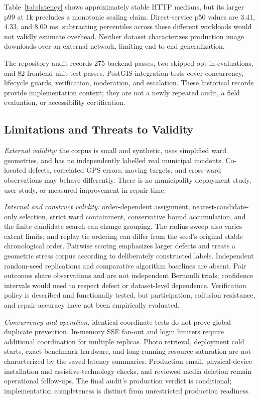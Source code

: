 \documentclass[conference,a4paper]{IEEEtran}
\begin{document}
Table~\ref{tab:latency} shows approximately stable HTTP medians, but its larger p99 at 1k precludes a monotonic scaling claim. Direct-service p50 values are 3.41, 4.33, and 8.00 ms; subtracting percentiles across these different workloads would not validly estimate overhead. Neither dataset characterizes production image downloads over an external network, limiting end-to-end generalization.

The repository audit records 275 backend passes, two skipped opt-in evaluations, and 82 frontend unit-test passes. PostGIS integration tests cover concurrency, lifecycle guards, verification, moderation, and escalation. These historical records provide implementation context; they are not a newly repeated audit, a field evaluation, or accessibility certification.

\subsection{Limitations and Threats to Validity}
\textit{External validity:} the corpus is small and synthetic, uses simplified ward geometries, and has no independently labelled real municipal incidents. Co-located defects, correlated GPS errors, moving targets, and cross-ward observations may behave differently. There is no municipality deployment study, user study, or measured improvement in repair time.

\textit{Internal and construct validity:} order-dependent assignment, nearest-candidate-only selection, strict ward containment, conservative bound accumulation, and the finite candidate search can change grouping. The radius sweep also varies extent limits, and replay tie ordering can differ from the seed's original stable chronological order. Pairwise scoring emphasizes larger defects and treats a geometric stress corpus according to deliberately constructed labels. Independent random-seed replications and comparative algorithm baselines are absent. Pair outcomes share observations and are not independent Bernoulli trials; confidence intervals would need to respect defect or dataset-level dependence. Verification policy is described and functionally tested, but participation, collusion resistance, and repair accuracy have not been empirically evaluated.

\textit{Concurrency and operation:} identical-coordinate tests do not prove global duplicate prevention. In-memory SSE fan-out and login limiters require additional coordination for multiple replicas. Photo retrieval, deployment cold starts, exact benchmark hardware, and long-running resource saturation are not characterized by the saved latency summaries. Production email, physical-device installation and assistive-technology checks, and reviewed media deletion remain operational follow-ups. The final audit's production verdict is conditional; implementation completeness is distinct from unrestricted production readiness.
\end{document}

